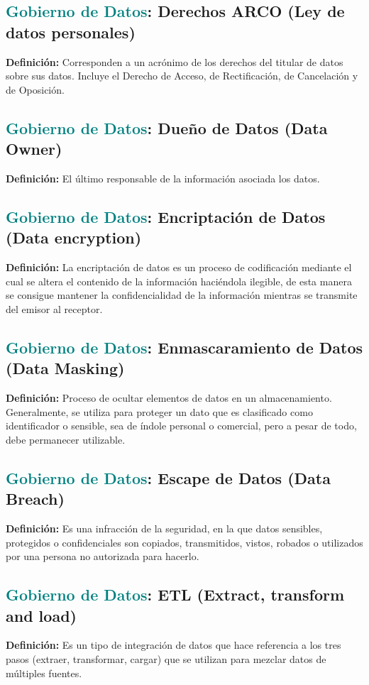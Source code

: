 \documentclass[12pt]{article}
\begin{document}
\subsection{\textcolor{teal}{Gobierno de Datos}: Derechos ARCO (Ley de datos personales)}
\textbf{Definición:} Corresponden a un acrónimo de los derechos del titular de datos sobre sus datos. Incluye el Derecho de Acceso, de Rectificación, de Cancelación y de Oposición.
\subsection{\textcolor{teal}{Gobierno de Datos}: Dueño de Datos (Data Owner)}
\textbf{Definición:} El último responsable de la información asociada los datos.
\subsection{\textcolor{teal}{Gobierno de Datos}: Encriptación de Datos (Data encryption)}
\textbf{Definición:} La encriptación de datos es un proceso de codificación mediante el cual se altera el contenido de la información haciéndola ilegible, de esta manera se consigue mantener la confidencialidad de la información mientras se transmite del emisor al receptor.
\subsection{\textcolor{teal}{Gobierno de Datos}: Enmascaramiento de Datos (Data Masking)}
\textbf{Definición:} Proceso de ocultar elementos de datos en un almacenamiento. Generalmente, se utiliza para proteger un dato que es clasificado como identificador o sensible, sea de índole personal o comercial, pero a pesar de todo, debe permanecer utilizable.
\subsection{\textcolor{teal}{Gobierno de Datos}: Escape de Datos (Data Breach)}
\textbf{Definición:} Es una infracción de la seguridad, en la que datos sensibles, protegidos o confidenciales son copiados, transmitidos, vistos, robados o utilizados por una persona no autorizada para hacerlo.
\subsection{\textcolor{teal}{Gobierno de Datos}: ETL (Extract, transform and load)}
\textbf{Definición:} Es un tipo de integración de datos que hace referencia a los tres pasos (extraer, transformar, cargar) que se utilizan para mezclar datos de múltiples fuentes.
\end{document}
